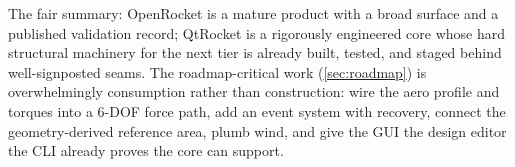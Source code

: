 The fair summary: OpenRocket is a mature product with a broad surface and a published validation
record; QtRocket is a rigorously engineered core whose hard structural machinery for the next
tier is already built, tested, and staged behind well-signposted seams. The roadmap-critical
work (\cref{sec:roadmap}) is overwhelmingly consumption rather than construction: wire the aero
profile and torques into a 6-DOF force path, add an event system with recovery, connect the
geometry-derived reference area, plumb wind, and give the GUI the design editor the CLI already
proves the core can support.

